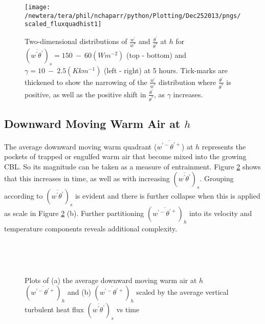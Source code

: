 \begin{figure}[htbp]
\centering
 \texttt{[image: /newtera/tera/phil/nchaparr/python/Plotting/Dec252013/pngs/scaled\_fluxquadhist1]}                 
\caption[Two-dimensional distributions of $\frac{w^{'}}{w^{*}}$ and $\frac{\theta^{'}}{\theta^{*}}$ for all runs]{Two-dimensional distributions of $\frac{w^{'}}{w^{*}}$ and $\frac{\theta^{'}}{\theta^{*}}$ at $h$ for $(\overline{w^{'}\theta^{'}})_{s} = 150 \ - \ 60 (Wm^{-2})$ (top - bottom) and $\gamma = 10 \ - \  2.5(Kkm^{-1})$ (left - right) at 5 hours. Tick-marks are thickened to show the narrowing of the $\frac{w^{'}}{w^{*}}$ distribution where $\frac{\theta^{'}}{\theta^{*}}$ is positive, as well as the positive shift in $\frac{\theta^{'}}{\theta^{*}}$, as $\gamma$ increases.}
\label{fig:scaled_fluxquadhs}
\end{figure}


\clearpage

\subsection{Downward Moving Warm Air at $h$}
\label{subsec:downwarm}

The average downward moving warm quadrant ($\overline{w^{'-}\theta^{'+}}$) at $h$ represents the pockets of trapped or engulfed warm air that become mixed into the growing \acs{CBL}.  So its magnitude can be taken as a measure of entrainment.  Figure \ref{fig:downwarm} shows that this increases in time, as well as with increasing $(\overline{w^{'}\theta^{'}})_{s}$.  Grouping according to $(\overline{w^{'}\theta^{'}})_{s}$ is evident and there is further collapse when this is applied as scale in Figure \ref{fig:downwarm} (b).  Further partitioning $(\overline{w^{'-}\theta^{'+}})_{h}$ into its velocity and temperature components reveals additional complexity.\\

\begin{figure}[htbp]
\begin{minipage}[b]{0.5\linewidth}
        \\
        \end{minipage}             
\quad
\begin{minipage}[b]{0.5\linewidth}
        \\
     
       \end{minipage}
        \caption[Downward moving warm air at $h$]{Plots of (a) the average downward moving warm air at $h$ $(\overline{w^{\prime-}\theta^{\prime+}})_{h}$ and (b) $(\overline{w^{\prime-}\theta^{\prime+}})_{h}$ scaled by the average vertical turbulent heat flux $ ( \overline{ w^{'} \theta^{'} } )_{s} $ vs time}
        \label{fig:downwarm}
\end{figure}

